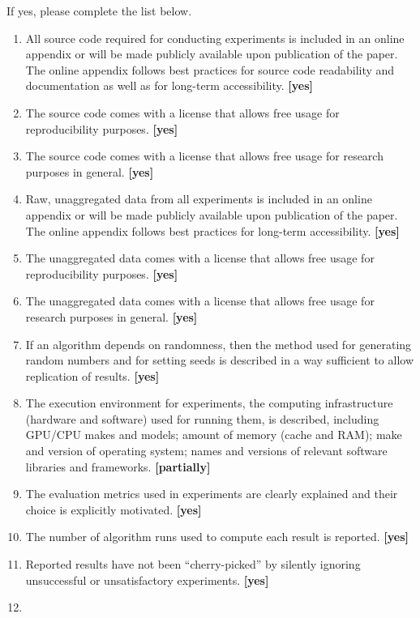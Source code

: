 If yes, please complete the list below.
\begin{enumerate}
    \item
    All source code required for conducting experiments is included in an
    online appendix or will be made publicly available upon publication of the
    paper. The online appendix follows best practices for source code
    readability and documentation as well as for long-term accessibility.
    \textbf{[yes]}
    \item The source code comes with a license that
    allows free usage for reproducibility purposes. \textbf{[yes]}
    \item The source code comes with a license that
    allows free usage for research purposes in general. \textbf{[yes]}
    \item
    Raw, unaggregated data from all experiments is included in an online
    appendix or will be made publicly available upon publication of the paper.
    The online appendix follows best practices for long-term accessibility.
    \textbf{[yes]}
    \item The unaggregated data comes with a license that
    allows free usage for reproducibility purposes. \textbf{[yes]}
    \item The unaggregated data comes with a license that
    allows free usage for research purposes in general. \textbf{[yes]}
    \item If an algorithm depends on randomness, then the method used for
    generating random numbers and for setting seeds is described in a way
    sufficient to allow replication of results. \textbf{[yes]}
    \item The execution environment for experiments, the computing
    infrastructure (hardware and software) used for running them, is described,
    including GPU/CPU makes and models; amount of memory (cache and RAM); make
    and version of operating system; names and versions of relevant software
    libraries and frameworks. \textbf{[partially]}
    \item
    The evaluation metrics used in experiments are clearly explained and their
    choice is explicitly motivated. \textbf{[yes]}
    \item
    The number of algorithm runs used to compute each result is reported.
    \textbf{[yes]}
    \item
    Reported results have not been ``cherry-picked'' by silently ignoring
    unsuccessful or unsatisfactory experiments. \textbf{[yes]}
    \item

\end{enumerate}
